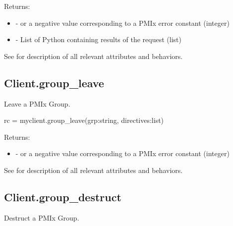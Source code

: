 Returns:

\begin{itemize}
    \item {} -  or a negative value corresponding to a PMIx error constant (integer)
    \item {} - List of Python  containing results of the request (list)
\end{itemize}

See  for description of all relevant attributes and behaviors.


\subsection{Client.group_leave}

\summary

Leave a PMIx Group.

\format

\pyspecificstart
\begin{codepar}
rc = myclient.group_leave(grp:string, directives:list)
\end{codepar}
\pyspecificend

\begin{arglist}
\end{arglist}

Returns:

\begin{itemize}
    \item {} -  or a negative value corresponding to a PMIx error constant (integer)
\end{itemize}

See  for description of all relevant attributes and behaviors.


\subsection{Client.group_destruct}

\summary

Destruct a PMIx Group.

